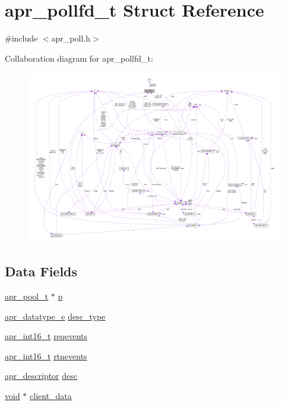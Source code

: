 \hypertarget{structapr__pollfd__t}{}\section{apr\+\_\+pollfd\+\_\+t Struct Reference}
\label{structapr__pollfd__t}


{\ttfamily \#include $<$apr\+\_\+poll.\+h$>$}



Collaboration diagram for apr\+\_\+pollfd\+\_\+t\+:
\nopagebreak
\begin{figure}[H]
\begin{center}
\leavevmode
\includegraphics[width=350pt]{structapr__pollfd__t__coll__graph}
\end{center}
\end{figure}
\subsection*{Data Fields}
\begin{DoxyCompactItemize}
\item 
\hyperlink{structapr__pool__t}{apr\+\_\+pool\+\_\+t} $\ast$ \hyperlink{structapr__pollfd__t_adae68586ed671472590efe8770de38cc}{p}
\item 
\hyperlink{group__apr__poll_ga0a8549d84c1721788b102a4cc8b4b0f0}{apr\+\_\+datatype\+\_\+e} \hyperlink{structapr__pollfd__t_acfafd260241a874745f49ba2df246c53}{desc\+\_\+type}
\item 
\hyperlink{group__apr__platform_ga43c359f64f6c84d8af869539e0737df4}{apr\+\_\+int16\+\_\+t} \hyperlink{structapr__pollfd__t_abcedac7097a97823a38ece6e47f4ea9f}{reqevents}
\item 
\hyperlink{group__apr__platform_ga43c359f64f6c84d8af869539e0737df4}{apr\+\_\+int16\+\_\+t} \hyperlink{structapr__pollfd__t_aed5b2109b27984975309922bfa84e3f6}{rtnevents}
\item 
\hyperlink{unionapr__descriptor}{apr\+\_\+descriptor} \hyperlink{structapr__pollfd__t_ad63baa71bb91f80513d33482e28fb967}{desc}
\item 
\hyperlink{group__MOD__ISAPI_gacd6cdbf73df3d9eed42fa493d9b621a6}{void} $\ast$ \hyperlink{structapr__pollfd__t_a01220e7a71963456461baa40b2a05716}{client\+\_\+data}
\end{DoxyCompactItemize}


